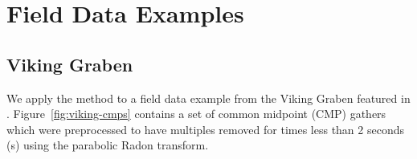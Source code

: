 \section{Field Data Examples}
\subsection{Viking Graben}

We apply the method to a field data example from the Viking Graben featured in \cite{vikingdata}. Figure~\ref{fig:viking-cmps} contains a set of  common midpoint (CMP) gathers which were preprocessed to have multiples removed for times less than 2 seconds (s) using the parabolic Radon transform. 
